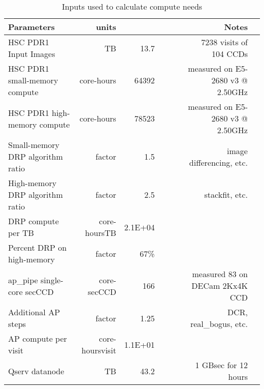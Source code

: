 \tiny \begin{longtable} { |p{}  |r  |r  |r  |r  |r  |r  |r |} 
\caption{Inputs used to calculate compute needs \label{tab:computeSizing}}\\ 
\hline 
\textbf{Parameters}&\textbf{units}&\textbf{}&\textbf{}&\textbf{}&\textbf{}&\textbf{Notes} \\ \hline
{HSC PDR1 Input Images}&{TB}&{13.7}&{}&{}&{}&{7238 visits of 104 CCDs} \\ \hline
{HSC PDR1 small-memory compute}&{core-hours}&{64392}&{}&{}&{}&{measured on E5-2680 v3 @ 2.50GHz} \\ \hline
{HSC PDR1 high-memory compute}&{core-hours}&{78523}&{}&{}&{}&{measured on E5-2680 v3 @ 2.50GHz} \\ \hline
{Small-memory DRP algorithm ratio}&{factor}&{1.5}&{}&{}&{}&{image differencing, etc.} \\ \hline
{High-memory DRP algorithm ratio}&{factor}&{2.5}&{}&{}&{}&{stackfit, etc.} \\ \hline
{DRP compute per TB}&{core-hours\/TB}&{2.1E+04}&&&& \\ \hline
{Percent DRP on high-memory}&{factor}&{67\%}&&&& \\ \hline
{ap\_pipe single-core sec\/CCD}&{core-sec\/CCD}&{166}&{}&{}&{}&{measured 83 on DECam 2Kx4K CCD} \\ \hline
{Additional AP steps}&{factor}&{1.25}&{}&{}&{}&{DCR, real\_bogus, etc.} \\ \hline
{AP compute per visit}&{core-hours\/visit}&{1.1E+01}&&&& \\ \hline
{Qserv data\/node}&{TB}&{43.2}&{}&{}&{}&{1 GB\/sec for 12 hours} \\ \hline
\end{longtable} \normalsize
